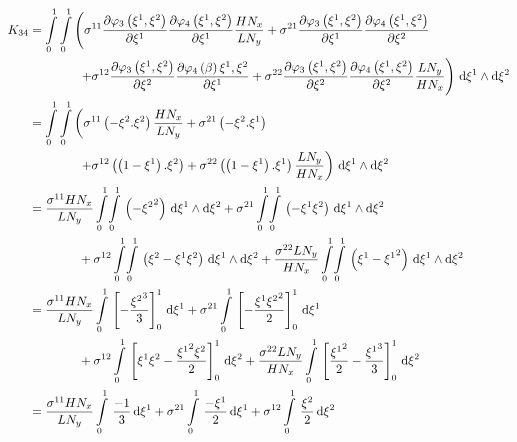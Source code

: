 \begin{equation}
  \begin{aligned}
    K_{34}&=\dintl{0}{1}\dintl{0}{1}\left(
    \conductivitytensorsymbol^{11}\delby{\lbfn{3}{\xione,\xitwo}}{\xione}
    \delby{\lbfn{4}{\xione,\xitwo}}{\xione}\dfrac{H N_{x}}{L N_{y}}+
    \conductivitytensorsymbol^{21}\delby{\lbfn{3}{\xione,\xitwo}}{\xione}
    \delby{\lbfn{4}{\xione,\xitwo}}{\xitwo}\right.\\
    &\qquad\qquad\left.+\conductivitytensorsymbol^{12}\delby{\lbfn{3}{\xione,\xitwo}}{\xitwo}
    \delby{\lbfn{4}{\beta}{\xione,\xitwo}}{\xione}+
    \conductivitytensorsymbol^{22}\delby{\lbfn{3}{\xione,\xitwo}}{\xitwo}
    \delby{\lbfn{4}{\xione,\xitwo}}{\xitwo}\dfrac{L N_{y}}{H N_{x}}\right)\infinitesimaltwo{\xione}{\xitwo}\\
    &=\dintl{0}{1}\dintl{0}{1}\left(
    \conductivitytensorsymbol^{11}\pbrac{-\xitwo.\xitwo}\dfrac{H N_{x}}{L N_{y}}+
    \conductivitytensorsymbol^{21}\pbrac{-\xitwo.\xione}\right.\\
    &\qquad\qquad\left.+\conductivitytensorsymbol^{12}\pbrac{\pbrac{1-\xione}.\xitwo}+
    \conductivitytensorsymbol^{22}\pbrac{\pbrac{1-\xione}.\xione}\dfrac{L N_{y}}{H N_{x}}\right)
    \infinitesimaltwo{\xione}{\xitwo}\\
    &=\dfrac{\conductivitytensorsymbol^{11} H N_{x}}{L N_{y}}\giint{0}{1}{0}{1}{\pbrac{-\xitwosq}}{\xione}{\xitwo}
    +\conductivitytensorsymbol^{21}\giint{0}{1}{0}{1}{\pbrac{-\xione\xitwo}}{\xione}{\xitwo}\\
    &\qquad\qquad+\conductivitytensorsymbol^{12}\giint{0}{1}{0}{1}{\pbrac{\xitwo-\xione\xitwo}}{\xione}{\xitwo}
    +\dfrac{\conductivitytensorsymbol^{22} L N_{y}}{H N_{x}}\giint{0}{1}{0}{1}{\pbrac{\xione-\xionesq}}{\xione}{\xitwo} \\
    &=\dfrac{\conductivitytensorsymbol^{11} H N_{x}}{L N_{y}}\gint{0}{1}{\sqbrac{-\dfrac{\xitwocube}{3}}^{1}_{0}}{\xione}
    +\conductivitytensorsymbol^{21}\gint{0}{1}{\sqbrac{-\dfrac{\xione\xitwosq}{2}}^{1}_{0}}{\xione}\\
    &\qquad\qquad+\conductivitytensorsymbol^{12}\gint{0}{1}{\sqbrac{\xione\xitwo-\dfrac{\xionesq\xitwo}{2}}^{1}_{0}}{\xitwo}
    +\dfrac{\conductivitytensorsymbol^{22} L N_{y}}{H N_{x}}\gint{0}{1}{\sqbrac{\dfrac{\xionesq}{2}-\dfrac{\xionecube}{3}}^{1}_{0}}{\xitwo} \\
    &=\dfrac{\conductivitytensorsymbol^{11} H N_{x}}{L N_{y}}\gint{0}{1}{\dfrac{-1}{3}}{\xione}
    +\conductivitytensorsymbol^{21}\gint{0}{1}{\dfrac{-\xione}{2}}{\xione}
    +\conductivitytensorsymbol^{12}\gint{0}{1}{\dfrac{\xitwo}{2}}{\xitwo}

\end{aligned}
\end{equation}
